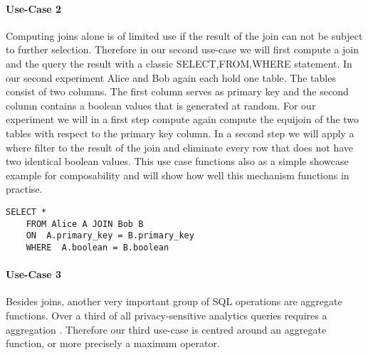 \paragraph{Use-Case 2}
Computing joins alone is of limited use if the result of the join can not be subject to further selection. Therefore in our second use-case we will first compute a join and the query the result with a classic SELECT,FROM,WHERE statement. In our second experiment Alice and Bob again each hold one table. The tables consist of two columns. The first column serves as primary key and the second column contains a boolean values that is generated at random. For our experiment we will in a first step compute again compute the equijoin of the two tables with respect to the primary key column. In a second step we will apply a where filter to the result of the join and eliminate every row that does not have two identical boolean values. This use case functions also as a simple showcase example for composability and will show how well this mechanism functions in practise.   
\begin{lstlisting}[caption={Functional equivalent SQL statement for our second use-case}]
	SELECT * 
	FROM Alice A JOIN Bob B 
	ON  A.primary_key = B.primary_key
	WHERE  A.boolean = B.boolean 
\end{lstlisting}
\paragraph{Use-Case 3}
Besides joins, another very important group of SQL operations are aggregate functions. Over a third of all privacy-sensitive analytics queries requires a aggregation \cite{johnson2017practical}. Therefore our third use-case is centred around an aggregate function, or more precisely a maximum operator. 
 

